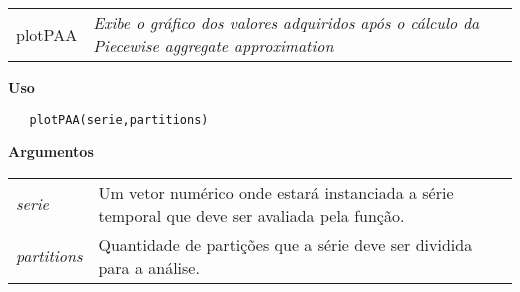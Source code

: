 \begin{table}[!ht]
\begin{center}
\begin{tabularx}{\textwidth}{ X X}
\hspace{0.5cm} plotPAA & \textit{Exibe o gráfico dos valores adquiridos após o cálculo da Piecewise aggregate approximation}\\
\end{tabularx}
\end{center}
\end{table} 

\vspace{-0.5cm}

\hrulefill  

\vspace{0.5cm}
  
\textbf{Uso}

\begin{lstlisting}
   plotPAA(serie,partitions)
\end{lstlisting}

\vspace{0.5cm}

\textbf{Argumentos}

\begin{table}[!ht]
\begin{center}
\begin{tabularx}{\textwidth}{X X}
\hspace{0.5cm} \textit{serie} \vspace{0.5cm}& Um vetor numérico onde estará instanciada a série temporal que deve ser avaliada pela função.\vspace{0.5cm}\\
\hspace{0.5cm} \textit{partitions} \vspace{0.5cm}& Quantidade de partições que a série deve ser dividida para a análise.\vspace{0.5cm}\\
\end{tabularx}
\end{center}
\end{table} 

